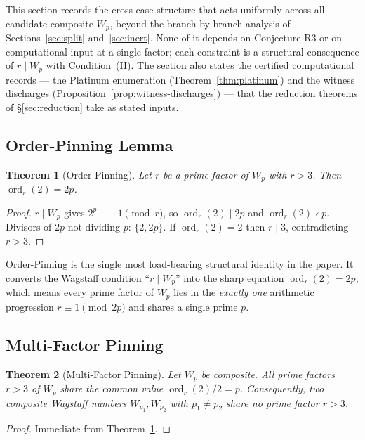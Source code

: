 \documentclass[11pt]{amsart}
\theoremstyle{plain}
\newtheorem{theorem}{Theorem}[section]
\theoremstyle{definition}
\theoremstyle{remark}
\numberwithin{equation}{section}
\newcommand{\ord}{\operatorname{ord}}
\begin{document}
This section records the cross-case structure that acts uniformly across all candidate composite $W_p$, beyond the branch-by-branch analysis of Sections~\ref{sec:split} and~\ref{sec:inert}. None of it depends on Conjecture R3 or on computational input at a single factor; each constraint is a structural consequence of $r \mid W_p$ with Condition~(II). The section also states the certified computational records --- the Platinum enumeration (Theorem~\ref{thm:platinum}) and the witness discharges (Proposition~\ref{prop:witness-discharges}) --- that the reduction theorems of \S\ref{sec:reduction} take as stated inputs.

\subsection{Order-Pinning Lemma}

\begin{theorem}[Order-Pinning]\label{thm:order-pinning}
Let $r$ be a prime factor of $W_p$ with $r > 3$. Then $\ord_r(2) = 2 p$.
\end{theorem}

\begin{proof}
$r \mid W_p$ gives $2^p \equiv -1 \pmod r$, so $\ord_r(2) \mid 2 p$ and $\ord_r(2) \nmid p$. Divisors of $2 p$ not dividing $p$: $\{2, 2 p\}$. If $\ord_r(2) = 2$ then $r \mid 3$, contradicting $r > 3$.
\end{proof}

Order-Pinning is the single most load-bearing structural identity in the paper. It converts the Wagstaff condition ``$r \mid W_p$'' into the sharp equation $\ord_r(2) = 2 p$, which means every prime factor of $W_p$ lies in the \emph{exactly one} arithmetic progression $r \equiv 1 \pmod{2 p}$ and shares a single prime $p$.

\subsection{Multi-Factor Pinning}

\begin{theorem}[Multi-Factor Pinning]\label{thm:multi-pinning}
Let $W_p$ be composite. All prime factors $r > 3$ of $W_p$ share the common value $\ord_r(2)/2 = p$. Consequently, two composite Wagstaff numbers $W_{p_1}, W_{p_2}$ with $p_1 \neq p_2$ share no prime factor $r > 3$.
\end{theorem}

\begin{proof}
Immediate from Theorem~\ref{thm:order-pinning}.
\end{proof}
\end{document}

